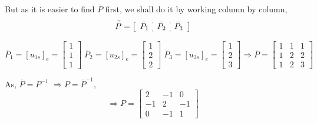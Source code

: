 \documentclass[a4paper]{article}
\begin{document}
\begin{qalist}
			But as it is easier to find $\bar{P}$ first, we shall do it by working column by column, 
			\renewcommand{\arraystretch}{1.5}
			\[\bar{\bar{P}} = \left[\begin{array}{c:c:c} {\bar{P}}_{1} &  {\bar{P}}_{2} & {\bar{P}}_{3}\end{array}\right]\]
			
			\begin{equation}{\bar{P}}_{1} = {[{u}_{1s}]}_{e} = \begin{bmatrix}1 \\ 1 \\ 1\end{bmatrix} \;
			{\bar{P}}_{2} = {[{u}_{2s}]}_{e} = \begin{bmatrix}1 \\ 2 \\ 2\end{bmatrix} \;
			{\bar{P}}_{3} = {[{u}_{3s}]}_{e} = \begin{bmatrix}1 \\ 2 \\ 3\end{bmatrix} 
			\Rightarrow \bar{P} = \begin{bmatrix} 1 & 1 & 1 \\ 1 & 2 & 2 \\ 1 & 2 & 3\end{bmatrix}\end{equation}
			
			As, $\bar{P} = {P}^{-1}$ $\Rightarrow P = {\bar{P}}^{-1}, $
			\begin{equation}
				\Rightarrow P = \begin{bmatrix}2 & -1 & 0 \\ -1 & 2 & -1 \\ 0 & -1 & 1\end{bmatrix}
			\end{equation}
		

\end{qalist}
\end{document}
